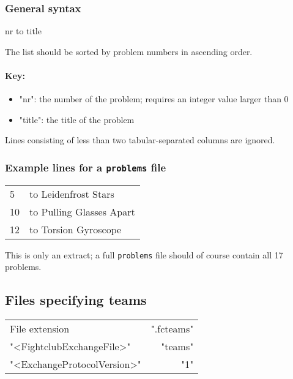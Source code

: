 \documentclass[11pt]{ltxdoc}
\newlength{\ccharwidth}
\def\tab{\hbox to \ccharwidth {{\rmfamily\small\mapsto}}}
\begin{document}
    
    \subsubsection*{General syntax}
    \begin{center}\ttfamily
        nr  \tab  title
    \end{center}

    The list should be sorted by problem numbers in ascending order.
    
    \paragraph{Key:}
    \begin{itemize}
        \item "nr": the number of the problem; requires an integer value larger than 0
        \item "title": the title of the problem
    \end{itemize}
    
    \smallskip
    Lines consisting of less than two tabular-separated columns are ignored.
    
    
    \subsubsection*{Example lines for a \texttt{problems} file}
    \begin{ttfamily}
        \begin{tabular}{@{}l>{\tab}l}%
            5  & Leidenfrost Stars \\
            10 & Pulling Glasses Apart \\
            12 & Torsion Gyroscope
        \end{tabular}
    \end{ttfamily}
    
    \bigskip
    This is only an extract; a full \texttt{problems} file should of course contain all 17 problems.
    
    
    
    
    \subsection{Files specifying teams}\label{sec:files-teams}
    \begin{center}
        \begin{tabular}{lr}
            File extension              & ".fcteams" \\
            "<FightclubExchangeFile>"   & "teams" \\
            "<ExchangeProtocolVersion>" & "1"
        \end{tabular}
    \end{center}
    
\end{document}
